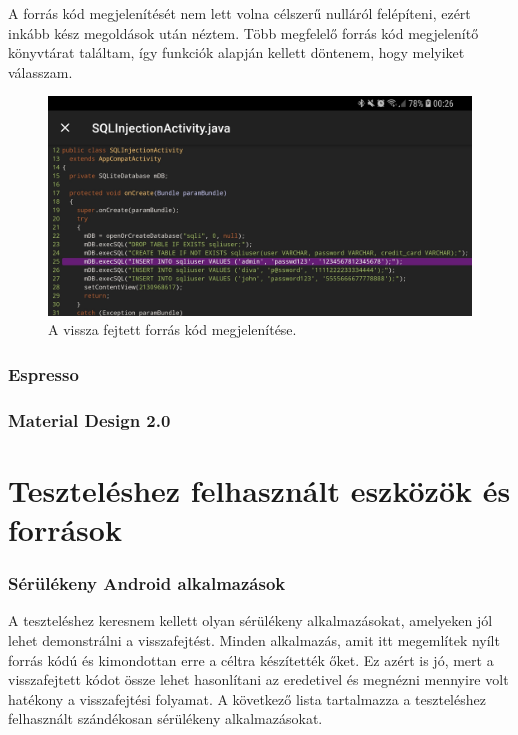 \documentclass{thesis-ekf}
\theoremstyle{definition}
\theoremstyle{remark}
\begin{document}
A forrás kód megjelenítését nem lett volna célszerű nulláról felépíteni, ezért inkább kész megoldások után néztem.
Több megfelelő forrás kód megjelenítő könyvtárat találtam, így funkciók alapján kellett döntenem, hogy melyiket válasszam.

\begin{figure}[!h]
	\centering
	\includegraphics[width=15cm]{kepek/code_view}
	\caption{A vissza fejtett forrás kód megjelenítése.}
	\label{dockerhub}
\end{figure}

\subsection{Espresso}

\subsection{Material Design 2.0}

\chapter{Teszteléshez felhasznált eszközök és források}\label{teszteles}

\subsection{Sérülékeny Android alkalmazások}

A teszteléshez keresnem kellett olyan sérülékeny alkalmazásokat, amelyeken jól lehet demonstrálni a visszafejtést.
Minden alkalmazás, amit itt megemlítek nyílt forrás kódú és kimondottan erre a céltra készítették őket.
Ez azért is jó, mert a visszafejtett kódot össze lehet hasonlítani az eredetivel és megnézni mennyire volt hatékony a visszafejtési folyamat.
A következő lista tartalmazza a teszteléshez felhasznált szándékosan sérülékeny alkalmazásokat.
\end{document}
